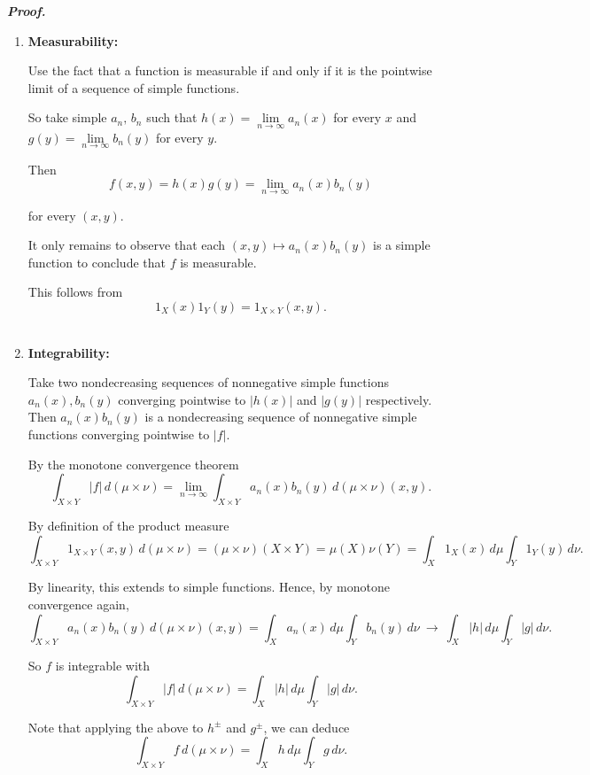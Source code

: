 \documentclass[a4paper,11pt]{article}
\begin{document}
\textbf{\textit{Proof.}}

\begin{enumerate}
	\item \textbf{Measurability:}

		Use the fact that a function is measurable if and only if it is the pointwise limit of a sequence of simple functions.

		So take simple $a_n,\,b_n$ such that $h(x) = \underset{n \to \infty}{\lim} a_n(x)$ for every $x$ and $g(y) = \underset{n \to \infty}{\lim} b_n(y)$ for every $y$.

		Then
			$$f(x,y) = h(x)g(y) = \underset{n \to \infty}{\lim} a_n(x)b_n(y)$$

		for every $(x,y)$.

		It only remains to observe that each $(x,y) \mapsto a_n(x)b_n(y)$ is a simple function to conclude that $f$ is measurable.

		This follows from
			$$1_X(x) 1_Y(y) = 1_{X \times Y}(x,y).$$\\

	\item \textbf{Integrability:}

		Take two nondecreasing sequences of nonnegative simple functions $a_n(x), b_n(y)$ converging pointwise to $|h(x)|$ and $|g(y)|$ respectively. Then $a_n(x)b_n(y)$ is a nondecreasing sequence of nonnegative simple functions converging pointwise to $|f|$.

		By the monotone convergence theorem
			$$\int_{X \times Y} |f|\,d(\mu\times\nu)
			= \underset{n \to \infty}{\lim} \int_{X \times Y} a_n(x)b_n(y)\,d(\mu\times\nu)(x,y).$$

		By definition of the product measure
			$$\int_{X \times Y} 1_{X \times Y}(x,y)\,d(\mu\times\nu)
			= (\mu\times\nu)(X \times Y)
			= \mu(X) \nu(Y)
			= \int_{X} 1_X(x)\,d\mu \int_{Y} 1_Y(y)\,d\nu.$$

		By linearity, this extends to simple functions. Hence, by monotone convergence again,
			$$\int_{X \times Y} a_n(x)b_n(y)\,d(\mu\times\nu)(x,y)
			= \int_{X} a_n(x)\,d\mu \int_{Y} b_n(y)\,d\nu\
			\longrightarrow\
			\int_X |h|\,d\mu \int_Y |g|\,d\nu.$$

		So $f$ is integrable with
			$$\int_{X \times Y} |f|\,d(\mu\times\nu)
			= \int_X |h|\,d\mu \int_Y |g|\,d\nu.$$

		Note that applying the above to $h^{\pm}$ and $g^{\pm}$, we can deduce
			$$\int_{X \times Y} f\,d(\mu\times\nu)
			= \int_X h\,d\mu \int_Y g\,d\nu.$$
\end{enumerate}




			
\end{document}
